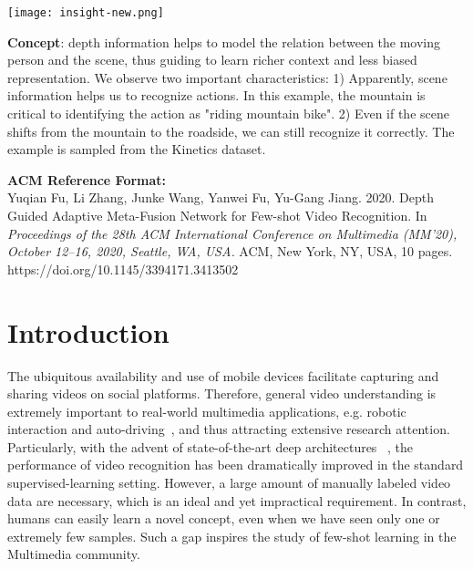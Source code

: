\documentclass[sigconf]{acmart}
\begin{document}
\begin{teaserfigure}
	    \centering
		\texttt{[image: insight-new.png]}
		\caption{
			\textbf{Concept}: depth information helps to model the relation between the moving person and the scene, thus guiding to learn richer context and less biased representation. We observe two important characteristics: 1) Apparently, scene information helps us to recognize actions. In this example, the mountain is critical to identifying the action as "riding mountain bike". 2) Even if the scene shifts from the mountain to the roadside, we can still recognize it correctly. The example is sampled from the Kinetics dataset. \label{idea} 
		}
		\label{fig:teaser}
	\end{teaserfigure}
	
	
	
	\maketitle
\vspace{-0.1in}
    {\fontsize{8pt}{8pt} \selectfont\textbf{ACM Reference Format:}\\Yuqian Fu, Li Zhang, Junke Wang, Yanwei Fu, Yu-Gang Jiang. 2020. Depth Guided Adaptive Meta-Fusion Network for Few-shot Video Recognition. In \textit{Proceedings of the 28th ACM International Conference on Multimedia (MM’20), October 12--16, 2020, Seattle, WA, USA.} ACM, New York, NY, USA, 10 pages. https://doi.org/10.1145/3394171.3413502 }
	\vspace{0.1in}
	
\section{Introduction}
	The ubiquitous availability and use of mobile devices facilitate capturing and sharing videos on social platforms. Therefore, general video understanding is extremely important to real-world multimedia applications, e.g. robotic interaction \cite{xu2019shared} and auto-driving~\cite{geiger2012we}, and thus attracting extensive research attention. Particularly, with the advent of state-of-the-art deep architectures ~\cite{simonyan2014two,carreira2017quo,feichtenhofer2019slowfast,perez2020egocentric}, the performance of video recognition has been dramatically improved in the standard supervised-learning setting. However, a large amount of manually labeled video data are necessary, which is an ideal and yet impractical requirement. In contrast, humans can easily learn a novel concept, even when we have seen only one or extremely few samples. Such a gap inspires the study of few-shot learning in the Multimedia community.
	
\end{document}
